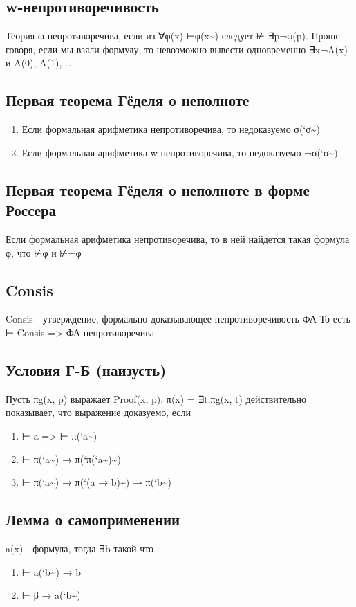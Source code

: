 \documentclass[11pt]{article}
\begin{document}
\subsection{w-непротиворечивость}
\label{sec-2-32}
Теория ω-непротиворечива, если из ∀φ(x) ⊢φ(x\textasciitilde{}) следует
⊬ ∃p¬φ(p). Проще говоря, если мы взяли
формулу, то невозможно вывести одновременно ∃x¬A(x)
и A(0), A(1), \ldots{}
\subsection{Первая теорема Гёделя о неполноте}
\label{sec-2-33}
\begin{enumerate}
\item Если формальная арифметика непротиворечива, то недоказуемо σ(`σ\textasciitilde{})
\item Если формальная арифметика w-непротиворечива, то недоказуемо ¬σ(`σ\textasciitilde{})
\end{enumerate}
\subsection{Первая теорема Гёделя о неполноте в форме Россера}
\label{sec-2-34}
Если формальная арифметика непротиворечива, то в ней найдется
такая формула φ, что ⊬φ и ⊬¬φ
\subsection{Consis}
\label{sec-2-35}
Consis - утверждение, формально доказывающее непротиворечивость ФА
То есть ⊢ Consis => ФА непротиворечива
\subsection{Условия Г-Б (наизусть)}
\label{sec-2-36}
Пусть πg(x, p) выражает Proof(x, p).
π(x) = ∃t.πg(x, t) действительно показывает,
что выражение доказуемо, если
\begin{enumerate}
\item ⊢ a => ⊢ π(`a\textasciitilde{})
\item ⊢ π(`a\textasciitilde{}) → π(`π(`a\textasciitilde{})\textasciitilde{})
\item ⊢ π(`a\textasciitilde{}) → π(`(a → b)\textasciitilde{}) → π(`b\textasciitilde{})
\end{enumerate}
\subsection{Лемма о самоприменении}
\label{sec-2-37}
a(x) - формула, тогда ∃b такой что
\begin{enumerate}
\item ⊢ a(`b\textasciitilde{}) → b
\item ⊢ β → a(`b\textasciitilde{})
\end{enumerate}
\end{document}
